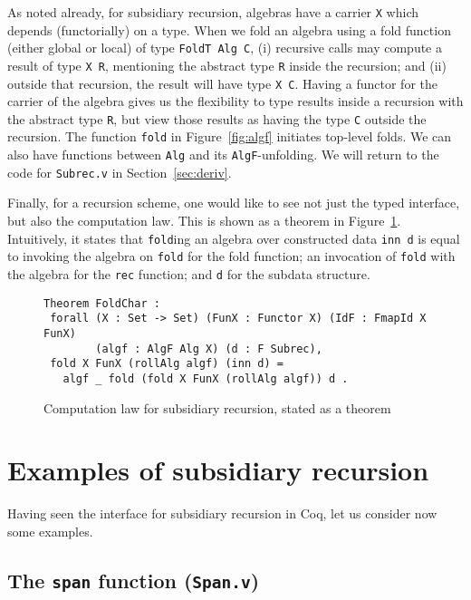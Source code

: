 \documentclass[a4paper,USenglish]{lipics-v2021}
\begin{document}
As noted already, for subsidiary recursion, algebras have a carrier
\verb|X| which depends (functorially) on a type.  When we fold an
algebra using a fold function (either global or local) of type
\verb|FoldT Alg C|, (i) recursive calls may compute a result of type
\verb|X R|, mentioning the abstract type \verb|R| inside the recursion;
and (ii) outside that recursion, the result will have type \verb|X C|.
Having a functor for the carrier of the algebra gives us the
flexibility to type results inside a recursion with the abstract type
\verb|R|, but view those results as having the type \verb|C| outside
the recursion.  The function \verb|fold| in Figure~\ref{fig:algf} initiates
top-level folds.  We can also have functions
between \verb|Alg| and its \verb|AlgF|-unfolding.  We will
return to the code for \verb|Subrec.v| in Section~\ref{sec:deriv}.

Finally, for a recursion scheme, one would like to see not just the
typed interface, but also the computation law.  This is shown as a
theorem in Figure~\ref{fig:comp}.  Intuitively, it states that
\verb|fold|ing an algebra over constructed data \verb|inn d| is equal
to invoking the algebra on \verb|fold|
for the fold function; an invocation of \verb|fold| with the algebra
for the \verb|rec| function; and \verb|d| for the subdata structure.

\begin{figure}
\begin{verbatim}
Theorem FoldChar :
 forall (X : Set -> Set) (FunX : Functor X) (IdF : FmapId X FunX)
        (algf : AlgF Alg X) (d : F Subrec),
 fold X FunX (rollAlg algf) (inn d) =
   algf _ fold (fold X FunX (rollAlg algf)) d .
\end{verbatim}
\caption{Computation law for subsidiary recursion, stated as a theorem}
\label{fig:comp}
\end{figure}

\section{Examples of subsidiary recursion}
\label{sec:examples}

Having seen the interface for subsidiary recursion in Coq, let us
consider now some examples.

\subsection{The \texttt{span} function (\texttt{Span.v})}
\end{document}
